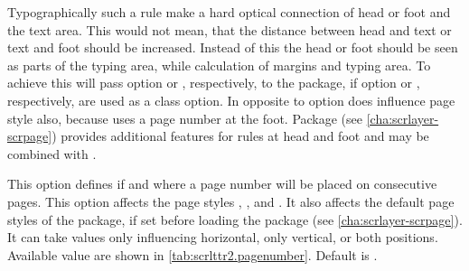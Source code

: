 Typographically such a rule make a hard optical
connection of head or foot and the text area. This would not mean, that the
distance between head and text or text and foot should be increased. Instead
of this the head or foot should be seen as parts of the typing area, while
calculation of margins and typing area. To achieve this \KOMAScript{} will
pass option %
 or
, respectively, to the 
package, if option  or , respectively,
are used as a class option. In opposite to
 option  does influence page style
 also, because  uses a page number at the
foot. Package %
 (see \autoref{cha:scrlayer-scrpage})
provides additional features for rules at head and foot and may be combined
with .%
%
\EndIndexGroup


\begin{Declaration}
\end{Declaration}
This option defines if and where a page number will be placed on consecutive
pages. This option affects the page
styles , , and
. It also affects the default page styles of the
 package, if
set before loading the package (see \autoref{cha:scrlayer-scrpage}). It can
take values only influencing horizontal, only vertical, or both
positions. Available value are shown in
\autoref{tab:scrlttr2.pagenumber}. Default is .

